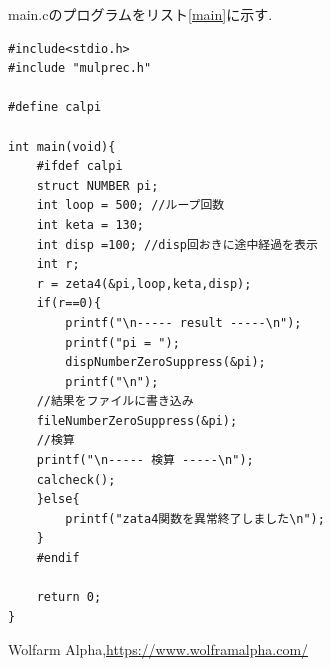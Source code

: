 \documentclass[a4j] {jarticle}
\begin{document}
    main.cのプログラムをリスト\ref{main}に示す.
    \begin{lstlisting}[basicstyle=\ttfamily\footnotesize, frame=single,label=main,caption=main.cのソースコード]
#include<stdio.h>
#include "mulprec.h"

#define calpi

int main(void){
    #ifdef calpi    
    struct NUMBER pi;
    int loop = 500; //ループ回数
    int keta = 130;
    int disp =100; //disp回おきに途中経過を表示
    int r;
    r = zeta4(&pi,loop,keta,disp);
    if(r==0){
        printf("\n----- result -----\n");
        printf("pi = ");
        dispNumberZeroSuppress(&pi);
        printf("\n");
    //結果をファイルに書き込み
    fileNumberZeroSuppress(&pi);
    //検算
    printf("\n----- 検算 -----\n");
    calcheck();
    }else{
        printf("zata4関数を異常終了しました\n");
    }
    #endif

    return 0;
}
    \end{lstlisting}
    
    \begin{thebibliography}{9}
         Wolfarm Alpha,\url{https://www.wolframalpha.com/}
    \end{thebibliography}
          
\end{document}

